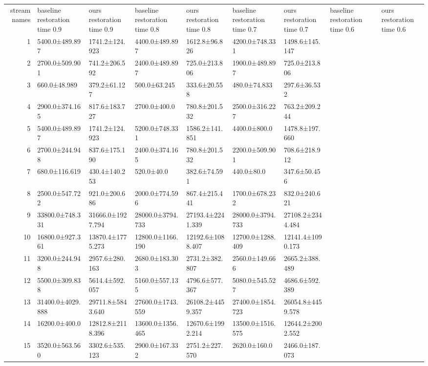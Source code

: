 \begin{tabular}{|r|l|l|l|l|l|l|l|l|}
  \hline
  stream names & baseline restoration time 0.9 & ours restoration time 0.9 & baseline restoration time 0.8 & ours restoration time 0.8 & baseline restoration time 0.7 & ours restoration time 0.7 & baseline restoration time 0.6 & ours restoration time 0.6 \\ 
  1 & 5400.0±489.897 & 1741.2±124.923 & 4400.0±489.897 & 1612.8±96.826 & 4200.0±748.331 & 1498.6±145.147 \\ 
  2 & 2700.0±509.901 & 741.2±206.592 & 2400.0±489.897 & 725.0±213.806 & 1900.0±489.897 & 725.0±213.806 \\ 
  3 & 660.0±48.989 & 379.2±61.127 & 500.0±63.245 & 333.6±20.558 & 480.0±74.833 & 297.6±36.532 \\ 
  4 & 2900.0±374.165 & 817.6±183.727 & 2700.0±400.0 & 780.8±201.532 & 2500.0±316.227 & 763.2±209.244 \\ 
  5 & 5400.0±489.897 & 1741.2±124.923 & 5200.0±748.331 & 1586.2±141.851 & 4400.0±800.0 & 1478.8±197.660 \\ 
  6 & 2700.0±244.948 & 837.6±175.190 & 2400.0±374.165 & 780.8±201.532 & 2200.0±509.901 & 708.6±218.912 \\ 
  7 & 680.0±116.619 & 430.4±140.253 & 520.0±40.0 & 382.6±74.591 & 440.0±80.0 & 347.6±50.456 \\ 
  8 & 2500.0±547.722 & 921.0±200.686 & 2000.0±774.596 & 867.4±215.441 & 1700.0±678.232 & 832.0±240.621 \\ 
  9 & 33800.0±748.331 & 31666.0±1927.794 & 28000.0±3794.733 & 27193.4±2241.339 & 28000.0±3794.733 & 27108.2±2344.484 \\ 
  10 & 16800.0±927.361 & 13870.4±1775.273 & 12800.0±1166.190 & 12192.6±1088.407 & 12700.0±1288.409 & 12141.4±1090.173 \\ 
  11 & 3200.0±244.948 & 2957.6±280.163 & 2680.0±183.303 & 2731.2±382.807 & 2560.0±149.666 & 2665.2±388.489 \\ 
  12 & 5500.0±309.838 & 5614.4±592.057 & 5160.0±557.135 & 4796.6±577.367 & 5080.0±545.527 & 4686.6±592.389 \\ 
  13 & 31400.0±4029.888 & 29711.8±5843.640 & 27600.0±1743.559 & 26108.2±4459.357 & 27400.0±1854.723 & 26054.8±4459.578 \\ 
  14 & 16200.0±400.0 & 12812.8±2118.396 & 13600.0±1356.465 & 12670.6±1992.214 & 13500.0±1516.575 & 12644.2±2002.552 \\ 
  15 & 3520.0±563.560 & 3302.6±535.123 & 2900.0±167.332 & 2751.2±227.570 & 2620.0±160.0 & 2466.0±187.073 \\ 

\end{tabular}
